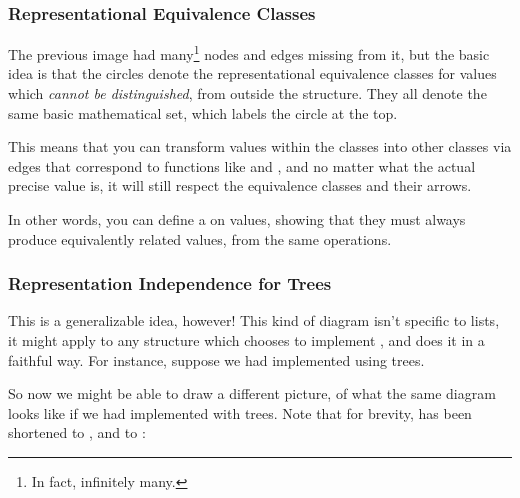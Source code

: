 \documentclass[aspectratio=169]{beamer}
\begin{document}
\begin{frame}[fragile]
  \frametitle{Representational Equivalence Classes}

  \ptmt

  The previous image had many\footnote{In fact, infinitely many.} nodes and edges missing from it,
  but the basic idea is that the circles denote the representational equivalence
  classes for values which \textit{cannot be distinguished}, from outside
  the structure. They all denote the same basic mathematical set, which labels
  the circle at the top.

  \pause
  \vspace{\fill}

  This means that you can transform values within the classes into other classes
  via edges that correspond to functions like  and
  , and no matter what the actual precise value is, it
  will still respect the equivalence classes and their arrows.

  \pause
  \vspace{\fill}

  In other words, you can define a  on values, showing that
  they must always produce equivalently related values, from the same
  operations.
\end{frame}

\begin{frame}[fragile]
  \frametitle{Representation Independence for Trees}

  This is a generalizable idea, however! This kind of diagram isn't
  specific to lists, it might apply to any structure which chooses to
  implement , and does it in a faithful way. For instance,
  suppose we had implemented  using trees.

  \pause
  \vspace{\fill}

  So now we might be able to draw a different picture, of what the same
  diagram looks like if we had implemented  with trees. Note
  that for brevity,  has been shortened to , and
   to :
\end{frame}
\end{document}
